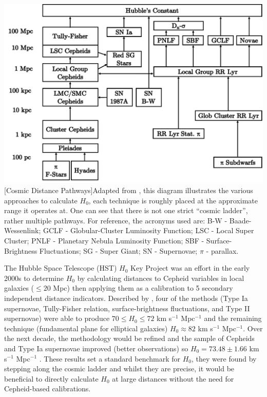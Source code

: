 \documentclass[12pt, onecolumn]{revtex4}    %
\begin{document}
\begin{center}
\includegraphics[width=0.8\linewidth]{figures/cosmic_distance_pathways}
[Cosmic Distance Pathways]{Adapted from \cite{jacoby_extragal}, this diagram illustrates the various approaches to calculate $H_0$, each technique is roughly placed at the approximate range it operates at. One can see that there is not one strict ``cosmic ladder'', rather multiple pathways. For reference, the acronyms used are: B-W - Baade-Wessenlink; GCLF - Globular-Cluster Luminosity Function; LSC - Local Super Cluster; PNLF - Planetary Nebula Luminosity Function; SBF - Surface-Brightness Fluctuations; SG - Super Giant; SN - Supernovae; $\pi$ - parallax.}
\label{fig:cosmic_pathways}
\end{center}

The Hubble Space Telescope (HST) $H_0$ Key Project was an effort in the early 2000s to determine $H_0$ by calculating distances to Cepheid variables in local galaxies ($\le 20$ Mpc) then applying them as a calibration to 5 secondary independent distance indicators. Described by \cite{freedman_hstkeystone}, four of the methods (Type Ia supernovae, Tully-Fisher relation, surface-brightness fluctuations, and Type II supernovae) were able to produce $70\le H_0 \le72$ km s$^{-1}$ Mpc$^{-1}$ and the remaining technique (fundamental plane for elliptical galaxies) $H_0\approx82$ km s$^{-1}$ Mpc$^{-1}$. Over the next decade, the methodology would be refined and the sample of Cepheids and Type Ia supernovae improved (better observations) so $H_0=73.48 \pm1.66$ km s$^{-1}$ Mpc$^{-1}$ \citep{2011ApJ...730..119R, 2016ApJ...826...56R, 2018ApJ...855..136R}. These results set a standard benchmark for $H_0$, they were found by stepping along the cosmic ladder and whilst they are precise, it would be beneficial to directly calculate $H_0$ at large distances without the need for Cepheid-based calibrations. \\
\end{document}
